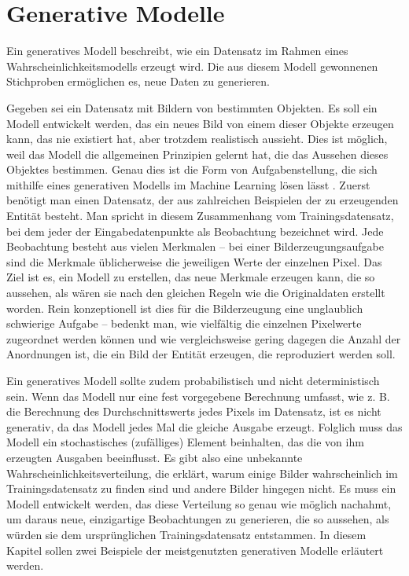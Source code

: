 \section{Generative Modelle}\label{Generative Modelle}
Ein generatives Modell beschreibt, wie ein Datensatz im Rahmen eines Wahrscheinlichkeitsmodells erzeugt wird. Die aus diesem Modell gewonnenen Stichproben ermöglichen es, neue Daten zu generieren.

Gegeben sei ein Datensatz mit Bildern von bestimmten Objekten. Es soll ein Modell entwickelt werden, das ein neues Bild von einem dieser Objekte erzeugen kann, das nie existiert hat, aber trotzdem realistisch aussieht. Dies ist möglich, weil das Modell die allgemeinen Prinzipien gelernt hat, die das Aussehen dieses Objektes bestimmen. Genau dies ist die Form von Aufgabenstellung, die sich mithilfe eines generativen Modells im Machine Learning lösen lässt \cite[vgl. S. 54]{fos19}.
Zuerst benötigt man einen Datensatz, der aus zahlreichen Beispielen der zu erzeugenden Entität besteht. Man spricht in diesem Zusammenhang vom Trainingsdatensatz, bei dem jeder der Eingabedatenpunkte als Beobachtung bezeichnet wird.
Jede Beobachtung besteht aus vielen Merkmalen – bei einer Bilderzeugungsaufgabe sind die Merkmale üblicherweise die jeweiligen Werte der einzelnen Pixel. Das Ziel ist es, ein Modell zu erstellen, das neue Merkmale erzeugen kann, die so aussehen, als wären sie nach den gleichen Regeln wie die Originaldaten erstellt worden. Rein konzeptionell ist dies für die Bilderzeugung eine unglaublich schwierige Aufgabe – bedenkt man, wie vielfältig die einzelnen Pixelwerte zugeordnet werden können und wie vergleichsweise gering dagegen die Anzahl der Anordnungen ist, die ein Bild der Entität erzeugen, die reproduziert werden soll.

Ein generatives Modell sollte zudem probabilistisch und nicht deterministisch sein. Wenn das Modell nur eine fest vorgegebene Berechnung umfasst, wie z. B. die Berechnung des Durchschnittswerts jedes Pixels im Datensatz, ist es nicht generativ, da das Modell jedes Mal die gleiche Ausgabe erzeugt. Folglich muss das Modell ein stochastisches (zufälliges) Element beinhalten, das die von ihm erzeugten Ausgaben beeinflusst.
Es gibt also eine unbekannte Wahrscheinlichkeitsverteilung, die erklärt, warum einige Bilder wahrscheinlich im Trainingsdatensatz zu finden sind und andere Bilder hingegen nicht. Es muss ein Modell entwickelt werden, das diese Verteilung so genau wie möglich nachahmt, um daraus neue, einzigartige Beobachtungen zu generieren, die so aussehen, als würden sie dem ursprünglichen Trainingsdatensatz entstammen. In diesem Kapitel sollen zwei Beispiele der meistgenutzten generativen Modelle erläutert werden.

